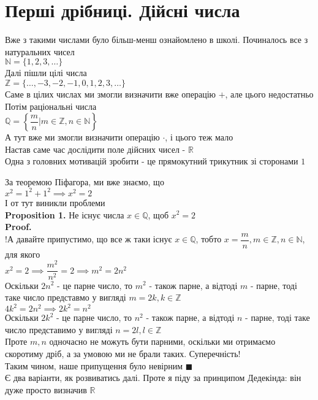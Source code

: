 \documentclass[a4paper, 14pt]{extarticle}
\def\bigline{\vspace{5mm}\\}
\def\prp#1{\textbf{Proposition {#1}}}
\def\proof{\textbf{Proof.}\\}
\def\bigline{\vspace{5mm}\\}
\def\qed{$\blacksquare$}
\begin{document}
	\section{Перші дрібниці. Дійсні числа}
	Вже з такими числами було більш-менш ознайомлено в школі. Починалось все з натуральних чисел \\
	$\mathbb{N} = \{1,2,3,\dots\}$ \\
	Далі пішли цілі  числа \\
	$\mathbb{Z} = \{\dots,-3,-2,-1,0,1,2,3,\dots\}$\\
	Саме в цілих числах ми змогли визначити вже операцію $+$, але цього недостатньо\\
	Потім раціональні числа \\
	$\mathbb{Q} = \left\{ \dfrac{m}{n} | m \in \mathbb{Z}, n \in \mathbb{N} \right\}$ \\
	А тут вже ми змогли визначити операцію $\cdot$, і цього теж мало\\
	Настав саме час дослідити поле дійсних чисел - $\mathbb{R}$\\
	Одна з головних мотивацій зробити - це прямокутний трикутник зі сторонами $1$
	\begin{figure}[H]
	\centering
	\end{figure}
	За теоремою Піфагора, ми вже знаємо, що\\
	$x^2 = 1^2 + 1^2 \implies x^2 = 2$\\
	І от тут виникли проблеми\\
	\prp{1.} Не існує числа $x \in \mathbb{Q}$, щоб $x^2 = 2$\\
	\proof
	!А давайте припустимо, що все ж таки існує $x \in \mathbb{Q}$, тобто $x= \dfrac{m}{n}, m \in \mathbb{Z}, n \in \mathbb{N}$, для якого\\
	$x^2 = 2 \implies \dfrac{m^2}{n^2} = 2 \implies m^2 = 2n^2$\\
	Оскільки $2n^2$ - це парне число, то $m^2$ - також парне, а відтоді $m$ - парне, тоді таке число представмо у вигляді $m = 2k, k \in \mathbb{Z}$\\
	$4k^2 = 2n^2 \implies 2k^2 = n^2$\\
	Оскільки $2k^2$ - це парне число, то $n^2$ - також парне, а відтоді $n$ - парне, тоді таке число представимо у вигляді $n = 2l, l \in \mathbb{Z}$\\
	Проте $m,n$ одночасно не можуть бути парними, оскільки ми отримаємо скоротиму дріб, а за умовою ми не брали таких. Суперечність!\\
	Таким чином, наше припущення було невірним \qed
	\bigline
	Є два варіанти, як розвиватись далі. Проте я піду за принципом Дедекінда: він дуже просто визначив $\mathbb{R}$
	
\end{document}
